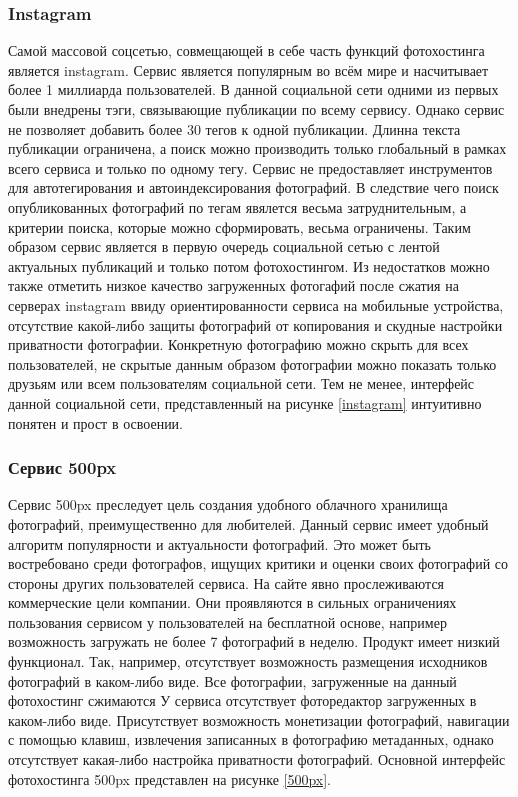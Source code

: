 
\subsubsection{Instagram}
Самой массовой соцсетью, совмещающей в себе часть функций фотохостинга является instagram.
Сервис является популярным во всём мире и насчитывает более 1 миллиарда пользователей.
В данной социальной сети одними из первых были внедрены тэги, связывающие публикации по всему сервису.
Однако сервис не позволяет добавить более 30 тегов к одной публикации. 
Длинна текста публикации ограничена, а поиск можно производить только глобальный в рамках всего сервиса и только по одному тегу.
Сервис не предоставляет инструментов для автотегирования и автоиндексирования фотографий.
В следствие чего поиск опубликованных фотографий по тегам явялется весьма затруднительным, а критерии поиска, которые можно сформировать, весьма ограничены. 
Таким образом сервис является в первую очередь социальной сетью с лентой актуальных публикаций и только потом фотохостингом.
Из недостатков можно также отметить низкое качество загруженных фотогафий после сжатия на серверах instagram ввиду ориентированности сервиса на мобильные устройства, отсутствие какой-либо защиты фотографий от копирования и скудные настройки приватности фотографии.
Конкретную фотографию можно скрыть для всех пользователей, не скрытые данным образом фотографии можно показать только друзьям или всем пользователям социальной сети.
Тем не менее, интерфейс данной социальной сети, представленный на рисунке \ref{instagram} интуитивно понятен и прост в освоении.


\subsubsection{Сервис 500px}
Сервис 500px преследует цель создания удобного облачного хранилища фотографий, преимущественно для любителей.
Данный сервис имеет удобный алгоритм популярности и актуальности фотографий.
Это может быть востребовано среди фотографов, ищущих критики и оценки своих фотографий со стороны других пользователей сервиса.
На сайте явно прослеживаются коммерческие цели компании.
Они проявляются в сильных ограничениях пользования сервисом у пользователей на бесплатной основе, например возможность загружать не более 7 фотографий в неделю.
Продукт имеет низкий функционал.
Так, например, отсутствует возможность размещения исходников фотографий в каком-либо виде.
Все фотографии, загруженные на данный фотохостинг сжимаются
У сервиса отсутствует фоторедактор загруженных в каком-либо виде.
Присутствует возможность монетизации фотографий, навигации с помощью клавиш, извлечения записанных в фотографию метаданных, однако отсутствует какая-либо настройка приватности фотографий.
Основной интерфейс фотохостинга 500px представлен на рисунке \ref{500px}.

